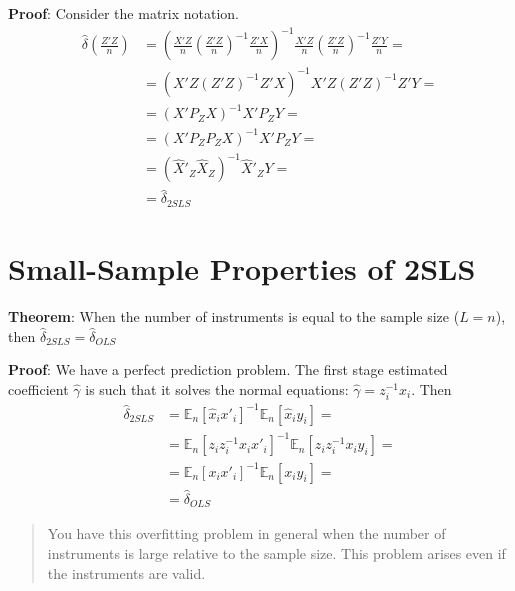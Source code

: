 \documentclass[12pt,]{book}
\begin{document}
\textbf{Proof}:
Consider the matrix notation.
\[
\begin{aligned}
    \hat{\delta} \left( \frac{Z'Z}{n}\right) &= \left( \frac{X'Z}{n} \left( \frac{Z'Z}{n}\right)^{-1} \frac{Z'X}{n} \right)^{-1} \frac{X'Z}{n} \left( \frac{Z'Z}{n}\right)^{-1} \frac{Z'Y}{n} = \\
    &= \left( X'Z(Z'Z)^{-1} Z'X \right)^{-1} X'Z(Z'Z)^{-1} Z'Y = \\
    &= \left(X'P_ZX\right)^{-1} X'P_ZY = \\
    &= \left(X'P_ZP_ZX\right)^{-1} X'P_ZY = \\
    &= \left(\hat{X}'_Z \hat{X}_Z\right)^{-1} \hat{X}'_ZY = \\
    &= \hat{\delta} _ {2SLS}
\end{aligned}
\]
\[\tag*{$\blacksquare$}\]

\hypertarget{small-sample-properties-of-2sls}{%
\section{Small-Sample Properties of 2SLS}\label{small-sample-properties-of-2sls}}

\textbf{Theorem}:
When the number of instruments is equal to the sample size (\(L = n\)), then \(\hat{\delta} _ {2SLS} = \hat{\delta} _ {OLS}\)

\textbf{Proof}:
We have a perfect prediction problem. The first stage estimated coefficient \(\hat{\gamma}\) is such that it solves the normal equations: \(\hat{\gamma} = z_i^{-1} x_i\). Then
\[
\begin{aligned}
    \hat{\delta} _ {2SLS} &= \mathbb E_n[\hat{x}_i x'_i]^{-1} \mathbb E_n[\hat{x}_i y_i] = \\
    &= \mathbb E_n[z_i z_i^{-1} x_i x'_i]^{-1} \mathbb E_n[z_i z_i^{-1} x_i y_i] = \\
    &= \mathbb E_n[x_i x'_i]^{-1} \mathbb E_n[x_i y_i] = \\
    &= \hat{\delta} _ {OLS}
\end{aligned}
\]
\[\tag*{$\blacksquare$}\]

\begin{quote}
You have this overfitting problem in general when the number of instruments is large relative to the sample size. This problem arises even if the instruments are valid.
\end{quote}
\end{document}
